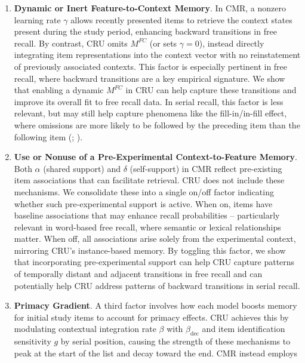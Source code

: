 \documentclass[
  man,
  floatsintext,
  longtable,
  nolmodern,
  notxfonts,
  notimes,
  draftfirst,
  colorlinks=true,linkcolor=blue,citecolor=blue,urlcolor=blue]{apa7}
\begin{document}
\begin{enumerate}
\def\labelenumi{\arabic{enumi}.}
\item
  \textbf{Dynamic or Inert Feature-to-Context Memory}. In CMR, a nonzero
  learning rate \(\gamma\) allows recently presented items to retrieve
  the context states present during the study period, enhancing backward
  transitions in free recall. By contrast, CRU omits \(M^{FC}\) (or sets
  \(\gamma=0\)), instead directly integrating item representations into
  the context vector with no reinstatement of previously associated
  contexts. This factor is especially pertinent in free recall, where
  backward transitions are a key empirical signature. We show that
  enabling a dynamic \(M^{FC}\) in CRU can help capture these
  transitions and improve its overall fit to free recall data. In serial
  recall, this factor is less relevant, but may still help capture
  phenomena like the fill-in/in-fill effect, where omissions are more
  likely to be followed by the preceding item than the following item
  (;
  ).
\item
  \textbf{Use or Nonuse of a Pre-Experimental Context-to-Feature
  Memory}. Both \(\alpha\) (shared support) and \(\delta\)
  (self-support) in CMR reflect pre-existing item associations that can
  facilitate retrieval. CRU does not include these mechanisms. We
  consolidate these into a single on/off factor indicating whether such
  pre-experimental support is active. When on, items have baseline
  associations that may enhance recall probabilities -- particularly
  relevant in word-based free recall, where semantic or lexical
  relationships matter. When off, all associations arise solely from the
  experimental context, mirroring CRU's instance-based memory. By
  toggling this factor, we show that incorporating pre-experimental
  support can help CRU capture patterns of temporally distant and
  adjacent transitions in free recall and can potentially help CRU
  address patterns of backward transitions in serial recall.
\item
  \textbf{Primacy Gradient}. A third factor involves how each model
  boosts memory for initial study items to account for primacy effects.
  CRU achieves this by modulating contextual integration rate \(\beta\)
  with \(\beta_\text{dec}\) and item identification sensitivity \(g\) by
  serial position, causing the strength of these mechanisms to peak at
  the start of the list and decay toward the end. CMR instead employs

\end{enumerate}
\end{document}
